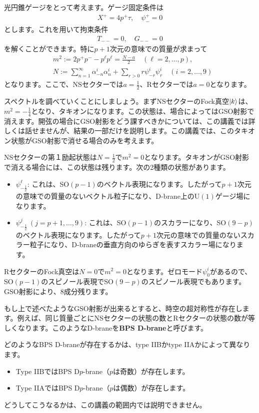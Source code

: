 \documentclass[report,paper=a4, fontsize=12pt, line_length=16cm, number_of_lines=34,dvipdfmx]{jlreq}
\numberwithin{equation}{chapter}
\numberwithin{equation}{section}
\newcommand{\kyou}[1]{{\sffamily \bfseries #1}}
\begin{document}
光円錐ゲージをとって考えます。ゲージ固定条件は
\begin{align}
  X^{+}=4p^{+}\tau,\quad \psi_{-}^{+}=0
\end{align}
とします。これを用いて拘束条件
\begin{align}
  T_{--}=0,\quad G_{--}=0
\end{align}
を解くことができます。特に$p+1$次元の意味での質量が求まって
\begin{align}
  &m^2:=2p^{+}p^{-}-p^{\ell}p^{\ell}=\frac{N-a}{2}\quad (\ell=2,\dots,p),\\ 
  &N:=\sum_{n=1}^{\infty}\alpha_{-n}^{i}\alpha_{n}^{i}+\sum_{r>0}r\psi_{-r}^{i}\psi_{r}^{i}\quad (i=2,\dots,9)
\end{align}
となります。ここで、NSセクターでは$a=\frac12$、Rセクターでは$a=0$となります。

スペクトルを調べていくことにしましょう。まずNSセクターのFock真空$\ket{k}$は、$m^2=-\frac14$となり、タキオンになります。この状態は、場合によってはGSO射影で消えます。開弦の場合にGSO射影をどう課すべきかについては、この講義では詳しくは話せませんが、結果の一部だけを説明します。この講義では、このタキオン状態がGSO射影で消せる場合のみを考えます。

NSセクターの第１励起状態は$N=\frac12$で$m^2=0$となります。タキオンがGSO射影で消える場合には、この状態は残ります。次の2種類の状態があります。
\begin{itemize}
  \item $\psi_{-\frac12}^{\ell}$: これは、SO$(p-1)$のベクトル表現になります。したがって$p+1$次元の意味での質量のないベクトル粒子になり、D-brane上のU$(1)$ゲージ場になります。
  \item $\psi_{-\frac12}^{j}\ (j=p+1,\dots,9)$: これは、SO$(p-1)$のスカラーになり、SO$(9-p)$のベクトル表現になります。したがって$p+1$次元の意味での質量のないスカラー粒子になり、D-braneの垂直方向のゆらぎを表すスカラー場になります。
\end{itemize}

RセクターのFock真空は$N=0$で$m^2=0$となります。ゼロモード$\psi^{i}_{0}$があるので、SO$(p-1)$のスピノール表現でSO$(9-p)$のスピノール表現でもあります。GSO射影により、8成分残ります。

もし上で述べたようなGSO射影が出来るとすると、時空の超対称性が存在します。例えば、同じ質量ごとにNSセクターの状態の数とRセクターの状態の数が等しくなります。このようなD-braneを\kyou{BPS D-brane}と呼びます。

どのようなBPS D-braneが存在するかは、type IIBかtype IIAかによって異なります。
\begin{itemize}
  \item Type IIBではBPS D$p$-brane（$p$は奇数）が存在します。
  \item Type IIAではBPS D$p$-brane（$p$は偶数）が存在します。
\end{itemize}
どうしてこうなるかは、この講義の範囲内では説明できません。
\end{document}
